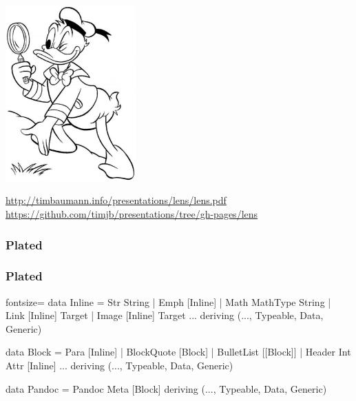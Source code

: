 \documentclass{beamer}
\begin{document}
{
\begin{frame}[b]
  \begin{center}
    \includegraphics[width=5cm,keepaspectratio]{donald-detective.jpg} \\
  \end{center}

  \centering \small
  \url{http://timbaumann.info/presentations/lens/lens.pdf} \\
  \url{https://github.com/timjb/presentations/tree/gh-pages/lens}
\end{frame}}

\begin{frame}[fragile]
  \frametitle{Plated}
\end{frame}

\begin{frame}[fragile]
  \frametitle{Plated}
  \begin{haskellcode*}{fontsize=\small}
data Inline
  = Str String
  | Emph [Inline]
  | Math MathType String
  | Link [Inline] Target
  | Image [Inline] Target
    ...
  deriving (..., Typeable, Data, Generic)

data Block
  = Para [Inline]
  | BlockQuote [Block]
  | BulletList [[Block]]
  | Header Int Attr [Inline]
    ...
  deriving (..., Typeable, Data, Generic)

data Pandoc = Pandoc Meta [Block]
  deriving (..., Typeable, Data, Generic)
  \end{haskellcode*}
\end{frame}


\end{document}
